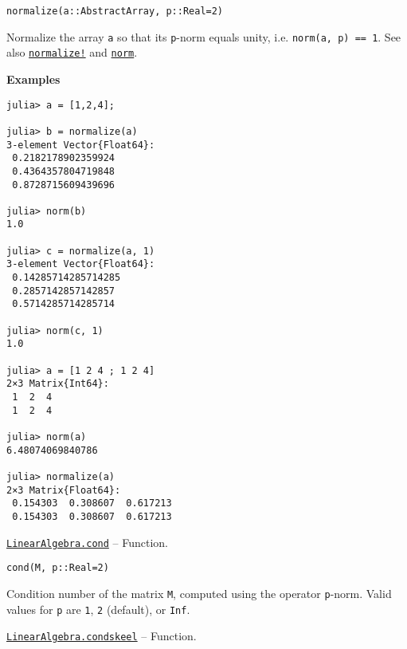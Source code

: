\begin{adjustwidth}{2em}{0pt}


\begin{verbatim}
normalize(a::AbstractArray, p::Real=2)
\end{verbatim}

Normalize the array \texttt{a} so that its \texttt{p}-norm equals unity, i.e. \texttt{norm(a, p) == 1}. See also \hyperlink{7806117778219468080}{\texttt{normalize!}} and \hyperlink{898926013064269707}{\texttt{norm}}.

\textbf{Examples}


\begin{verbatim}
julia> a = [1,2,4];

julia> b = normalize(a)
3-element Vector{Float64}:
 0.2182178902359924
 0.4364357804719848
 0.8728715609439696

julia> norm(b)
1.0

julia> c = normalize(a, 1)
3-element Vector{Float64}:
 0.14285714285714285
 0.2857142857142857
 0.5714285714285714

julia> norm(c, 1)
1.0

julia> a = [1 2 4 ; 1 2 4]
2×3 Matrix{Int64}:
 1  2  4
 1  2  4

julia> norm(a)
6.48074069840786

julia> normalize(a)
2×3 Matrix{Float64}:
 0.154303  0.308607  0.617213
 0.154303  0.308607  0.617213

\end{verbatim}



\end{adjustwidth}
\hypertarget{875685967830602736}{}
\hyperlink{875685967830602736}{\texttt{LinearAlgebra.cond}}  -- {Function.}

\begin{adjustwidth}{2em}{0pt}


\begin{verbatim}
cond(M, p::Real=2)
\end{verbatim}

Condition number of the matrix \texttt{M}, computed using the operator \texttt{p}-norm. Valid values for \texttt{p} are \texttt{1}, \texttt{2} (default), or \texttt{Inf}.



\end{adjustwidth}
\hypertarget{11563712892597655531}{}
\hyperlink{11563712892597655531}{\texttt{LinearAlgebra.condskeel}}  -- {Function.}

